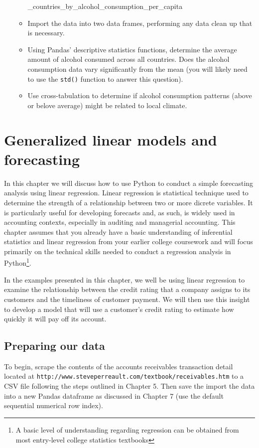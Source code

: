 \documentclass{book}
\begin{document}
\begin{enumerate}
\begin{itemize}
	\_countries\_by\_alcohol\_consumption\_per\_capita
	\item Import the data into two data frames, performing any data clean up that is necessary.
	\item Using Pandas' descriptive statistics functions, determine the average amount of alcohol consumed across all countries. Does the alcohol consumption data vary significantly from the mean (you will likely need to use the \texttt{std()} function to answer this question).
	\item Use cross-tabulation to determine if alcohol consumption patterns (above or belove average) might be related to local climate.
\end{itemize}
\end{enumerate}

\chapter{Generalized linear models and forecasting}

In this chapter we will discuss how to use Python to conduct a simple forecasting analysis using linear regression. Linear regression is statistical technique used to determine the strength of a relationship between two or more dicrete variables. It is particularly useful for developing forecasts and, as such, is widely used in accounting contexts, especially in auditing and managerial accounting. This chapter assumes that you already have a basic understanding of inferential statistics and linear regression from your earlier college coursework and will focus primarily on the technical skills needed to conduct a regression analysis in Python\footnote{A basic level of understanding regarding regression can be obtained from most entry-level college statistics textbooks}. 

In the examples presented in this chapter, we well be using linear regression to examine the relationship between the credit rating that a company assigns to its customers and the timeliness of customer payment. We will then use this insight to develop a model that will use a customer's credit rating to estimate how quickly it will pay off its account.  

\section{Preparing our data}

To begin, scrape the contents of the accounts receivables transaction detail located at \texttt{http://www.steveperreault.com/textbook/receivables.htm} to a CSV file following the steps outlined in Chapter 5. Then save the import the data into a new Pandas dataframe as discussed in Chapter 7 (use the default sequential numerical row index).
\end{document}
